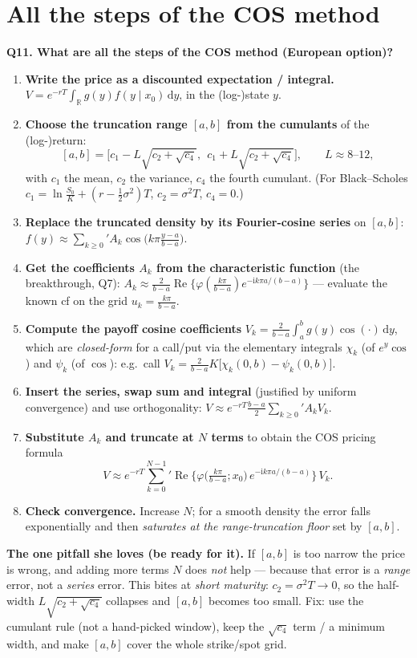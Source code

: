 \documentclass[11pt]{article}
\newcommand{\R}{\mathbb{R}}
\newcommand{\Real}{\operatorname{Re}}
\newcommand{\ii}{\mathrm{i}}
\newcommand{\dd}{\,\mathrm{d}}
\newcommand{\ch}{\varphi}
\newcommand{\psumN}{{\sum_{k=0}^{N-1}}'}
\newcommand{\Qhead}[1]{\bigskip\noindent\textbf{\large #1}\par\nobreak\smallskip}
\begin{document}
\section{All the steps of the COS method}
\Qhead{Q11. What are all the steps of the COS method (European option)?}
\begin{enumerate}
  \item \textbf{Write the price as a discounted expectation / integral.}
  $V=e^{-rT}\int_{\R}g(y)f(y\mid x_0)\dd y$, in the (log-)state $y$.
  \item \textbf{Choose the truncation range $[a,b]$ from the cumulants} of the (log-)return:
  \[
  [a,b]=\Big[c_1-L\sqrt{c_2+\sqrt{c_4}},\ \ c_1+L\sqrt{c_2+\sqrt{c_4}}\Big],\qquad L\approx 8\text{--}12 ,
  \]
  with $c_1$ the mean, $c_2$ the variance, $c_4$ the fourth cumulant. (For Black--Scholes
  $c_1=\ln\tfrac{S_0}{K}+(r-\tfrac12\sigma^2)T$, $c_2=\sigma^2T$, $c_4=0$.)
  \item \textbf{Replace the truncated density by its Fourier-cosine series} on $[a,b]$:
  $f(y)\approx\sum_{k\ge0}{}'A_k\cos\!\big(k\pi\frac{y-a}{b-a}\big)$.
  \item \textbf{Get the coefficients $A_k$ from the characteristic function} (the breakthrough, Q7):
  $A_k\approx\frac{2}{b-a}\Real\{\ch(\tfrac{k\pi}{b-a})e^{-\ii k\pi a/(b-a)}\}$ --- evaluate the known cf on the
  grid $u_k=\tfrac{k\pi}{b-a}$.
  \item \textbf{Compute the payoff cosine coefficients} $V_k=\frac{2}{b-a}\int_a^b g(y)\cos(\cdot)\dd y$, which
  are \emph{closed-form} for a call/put via the elementary integrals $\chi_k$ (of $e^{y}\cos$) and $\psi_k$
  (of $\cos$): e.g.\ call $V_k=\frac{2}{b-a}K\big[\chi_k(0,b)-\psi_k(0,b)\big]$.
  \item \textbf{Insert the series, swap sum and integral} (justified by uniform convergence) and use
  orthogonality:
  $V\approx e^{-rT}\frac{b-a}{2}\sum_{k\ge0}{}'A_kV_k$.
  \item \textbf{Substitute $A_k$ and truncate at $N$ terms} to obtain the COS pricing formula
  \begin{equation}
  \boxed{\;V\approx e^{-rT}\psumN \Real\!\Big\{\ch\!\Big(\tfrac{k\pi}{b-a};x_0\Big)\,e^{-\ii k\pi a/(b-a)}\Big\}\,V_k.\;}
  \end{equation}
  \item \textbf{Check convergence.} Increase $N$; for a smooth density the error falls exponentially and then
  \emph{saturates at the range-truncation floor} set by $[a,b]$.
\end{enumerate}
\begin{keybox}
\textbf{The one pitfall she loves (be ready for it).} If $[a,b]$ is too narrow the price is wrong, and adding
more terms $N$ does \emph{not} help --- because that error is a \emph{range} error, not a \emph{series} error.
This bites at \emph{short maturity}: $c_2=\sigma^2T\to0$, so the half-width $L\sqrt{c_2+\sqrt{c_4}}$ collapses
and $[a,b]$ becomes too small. Fix: use the cumulant rule (not a hand-picked window), keep the $\sqrt{c_4}$
term / a minimum width, and make $[a,b]$ cover the whole strike/spot grid.
\end{keybox}
\end{document}
